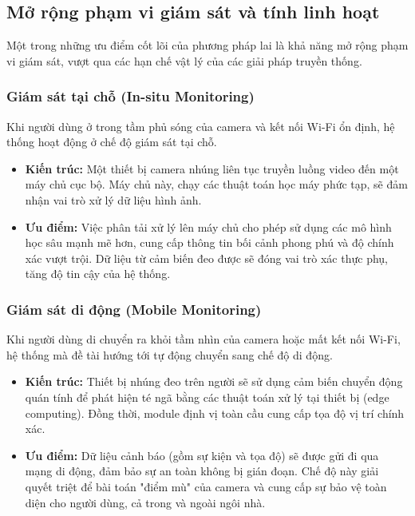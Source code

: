 \subsection{Mở rộng phạm vi giám sát và tính linh hoạt}

Một trong những ưu điểm cốt lõi của phương pháp lai là khả năng mở rộng phạm vi giám sát, vượt qua các hạn chế vật lý của các giải pháp truyền thống.

\subsubsection{Giám sát tại chỗ (In-situ Monitoring)}

Khi người dùng ở trong tầm phủ sóng của camera và kết nối Wi-Fi ổn định, hệ thống hoạt động ở chế độ giám sát tại chỗ.
\begin{itemize}
    \item \textbf{Kiến trúc:} Một thiết bị camera nhúng liên tục truyền luồng video đến một máy chủ cục bộ. Máy chủ này, chạy các thuật toán học máy phức tạp, sẽ đảm nhận vai trò xử lý dữ liệu hình ảnh.
    \item \textbf{Ưu điểm:} Việc phân tải xử lý lên máy chủ cho phép sử dụng các mô hình học sâu mạnh mẽ hơn, cung cấp thông tin bối cảnh phong phú và độ chính xác vượt trội. Dữ liệu từ cảm biến đeo được sẽ đóng vai trò xác thực phụ, tăng độ tin cậy của hệ thống.
\end{itemize}

\subsubsection{Giám sát di động (Mobile Monitoring)}

Khi người dùng di chuyển ra khỏi tầm nhìn của camera hoặc mất kết nối Wi-Fi, hệ thống mà đề tài hướng tới tự động chuyển sang chế độ di động.
\begin{itemize}
    \item \textbf{Kiến trúc:} Thiết bị nhúng đeo trên người sẽ sử dụng cảm biến chuyển động quán tính để phát hiện té ngã bằng các thuật toán xử lý tại thiết bị (edge computing). Đồng thời, module định vị toàn cầu cung cấp tọa độ vị trí chính xác.
    \item \textbf{Ưu điểm:} Dữ liệu cảnh báo (gồm sự kiện và tọa độ) sẽ được gửi đi qua mạng di động, đảm bảo sự an toàn không bị gián đoạn. Chế độ này giải quyết triệt để bài toán "điểm mù" của camera và cung cấp sự bảo vệ toàn diện cho người dùng, cả trong và ngoài ngôi nhà.
\end{itemize}

